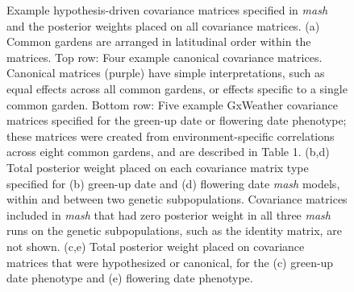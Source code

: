 \documentclass[
  9pt,
  twocolumn,
  twoside]{pnas-new}
\begin{document}
\begin{figure}


\caption{\label{fig-covar}Example hypothesis-driven covariance matrices
specified in \emph{mash} and the posterior weights placed on all
covariance matrices. (a) Common gardens are arranged in latitudinal
order within the matrices. Top row: Four example canonical covariance
matrices. Canonical matrices (purple) have simple interpretations, such
as equal effects across all common gardens, or effects specific to a
single common garden. Bottom row: Five example GxWeather covariance
matrices specified for the green-up date or flowering date phenotype;
these matrices were created from environment-specific correlations
across eight common gardens, and are described in Table 1. (b,d) Total
posterior weight placed on each covariance matrix type specified for (b)
green-up date and (d) flowering date \emph{mash} models, within and
between two genetic subpopulations. Covariance matrices included in
\emph{mash} that had zero posterior weight in all three \emph{mash} runs
on the genetic subpopulations, such as the identity matrix, are not
shown. (c,e) Total posterior weight placed on covariance matrices that
were hypothesized or canonical, for the (c) green-up date phenotype and
(e) flowering date phenotype.}

\end{figure}%
\end{document}
